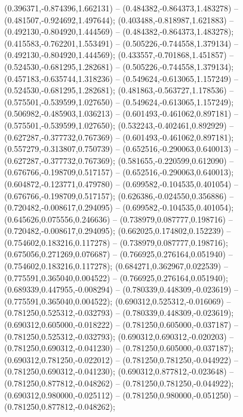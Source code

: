  (0.396371,-0.874396,1.662131) -- (0.484382,-0.864373,1.483278) -- (0.481507,-0.924692,1.497644);
 (0.403488,-0.818987,1.621883) -- (0.492130,-0.804920,1.444569) -- (0.484382,-0.864373,1.483278);
 (0.415583,-0.762201,1.553491) -- (0.505226,-0.744558,1.379134) -- (0.492130,-0.804920,1.444569);
 (0.433557,-0.701868,1.451857) -- (0.524530,-0.681295,1.282681) -- (0.505226,-0.744558,1.379134);
 (0.457183,-0.635744,1.318236) -- (0.549624,-0.613065,1.157249) -- (0.524530,-0.681295,1.282681);
 (0.481863,-0.563727,1.178536) -- (0.575501,-0.539599,1.027650) -- (0.549624,-0.613065,1.157249);
 (0.506982,-0.485903,1.036213) -- (0.601493,-0.461062,0.897181) -- (0.575501,-0.539599,1.027650);
 (0.532243,-0.402461,0.892929) -- (0.627287,-0.377732,0.767369) -- (0.601493,-0.461062,0.897181);
 (0.557279,-0.313807,0.750739) -- (0.652516,-0.290063,0.640013) -- (0.627287,-0.377732,0.767369);
 (0.581655,-0.220599,0.612090) -- (0.676766,-0.198709,0.517157) -- (0.652516,-0.290063,0.640013);
 (0.604872,-0.123771,0.479780) -- (0.699582,-0.104535,0.401054) -- (0.676766,-0.198709,0.517157);
 (0.626386,-0.024550,0.356886) -- (0.720482,-0.008617,0.294095) -- (0.699582,-0.104535,0.401054);
 (0.645626,0.075556,0.246636) -- (0.738979,0.087777,0.198716) -- (0.720482,-0.008617,0.294095);
 (0.662025,0.174802,0.152239) -- (0.754602,0.183216,0.117278) -- (0.738979,0.087777,0.198716);
 (0.675056,0.271269,0.076687) -- (0.766925,0.276164,0.051940) -- (0.754602,0.183216,0.117278);
 (0.684271,0.362967,0.022539) -- (0.775591,0.365040,0.004522) -- (0.766925,0.276164,0.051940);
 (0.689339,0.447955,-0.008294) -- (0.780339,0.448309,-0.023619) -- (0.775591,0.365040,0.004522);
 (0.690312,0.525312,-0.016069) -- (0.781250,0.525312,-0.032793) -- (0.780339,0.448309,-0.023619);
 (0.690312,0.605000,-0.018222) -- (0.781250,0.605000,-0.037187) -- (0.781250,0.525312,-0.032793);
 (0.690312,0.690312,-0.020203) -- (0.781250,0.690312,-0.041230) -- (0.781250,0.605000,-0.037187);
 (0.690312,0.781250,-0.022012) -- (0.781250,0.781250,-0.044922) -- (0.781250,0.690312,-0.041230);
 (0.690312,0.877812,-0.023648) -- (0.781250,0.877812,-0.048262) -- (0.781250,0.781250,-0.044922);
 (0.690312,0.980000,-0.025112) -- (0.781250,0.980000,-0.051250) -- (0.781250,0.877812,-0.048262);

